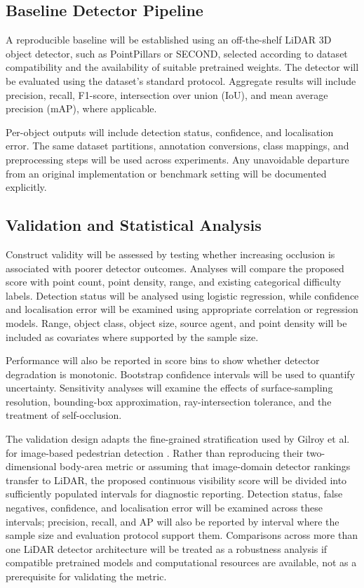 \subsection{Baseline Detector Pipeline}

A reproducible baseline will be established using an off-the-shelf LiDAR 3D object detector, such as PointPillars or SECOND, selected according to dataset compatibility and the availability of suitable pretrained weights. The detector will be evaluated using the dataset's standard protocol. Aggregate results will include precision, recall, F1-score, intersection over union (IoU), and mean average precision (mAP), where applicable.

Per-object outputs will include detection status, confidence, and localisation error. The same dataset partitions, annotation conversions, class mappings, and preprocessing steps will be used across experiments. Any unavoidable departure from an original implementation or benchmark setting will be documented explicitly.

\subsection{Validation and Statistical Analysis}

Construct validity will be assessed by testing whether increasing occlusion is associated with poorer detector outcomes. Analyses will compare the proposed score with point count, point density, range, and existing categorical difficulty labels. Detection status will be analysed using logistic regression, while confidence and localisation error will be examined using appropriate correlation or regression models. Range, object class, object size, source agent, and point density will be included as covariates where supported by the sample size.

Performance will also be reported in score bins to show whether detector degradation is monotonic. Bootstrap confidence intervals will be used to quantify uncertainty. Sensitivity analyses will examine the effects of surface-sampling resolution, bounding-box approximation, ray-intersection tolerance, and the treatment of self-occlusion.


The validation design adapts the fine-grained stratification used by Gilroy et al. for image-based pedestrian detection \cite{bib_ref_32}. Rather than reproducing their two-dimensional body-area metric or assuming that image-domain detector rankings transfer to LiDAR, the proposed continuous visibility score will be divided into sufficiently populated intervals for diagnostic reporting. Detection status, false negatives, confidence, and localisation error will be examined across these intervals; precision, recall, and AP will also be reported by interval where the sample size and evaluation protocol support them. Comparisons across more than one LiDAR detector architecture will be treated as a robustness analysis if compatible pretrained models and computational resources are available, not as a prerequisite for validating the metric.


